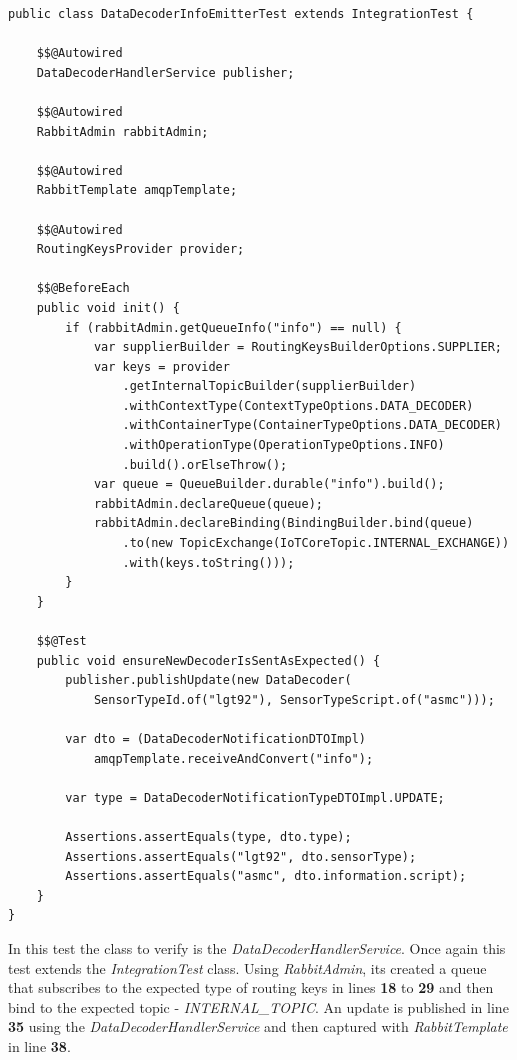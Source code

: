 \begin{lstlisting}[style=Java, caption=Functional Test - Message Broker Interaction - \textbf{Data Decoder Master Backend}, label={code:implementation:tests:func4}]
public class DataDecoderInfoEmitterTest extends IntegrationTest {

    $$@Autowired
    DataDecoderHandlerService publisher;

    $$@Autowired
    RabbitAdmin rabbitAdmin;

    $$@Autowired
    RabbitTemplate amqpTemplate;

    $$@Autowired
    RoutingKeysProvider provider;

    $$@BeforeEach
    public void init() {
        if (rabbitAdmin.getQueueInfo("info") == null) {
            var supplierBuilder = RoutingKeysBuilderOptions.SUPPLIER;
            var keys = provider
                .getInternalTopicBuilder(supplierBuilder)
                .withContextType(ContextTypeOptions.DATA_DECODER)
                .withContainerType(ContainerTypeOptions.DATA_DECODER)
                .withOperationType(OperationTypeOptions.INFO)
                .build().orElseThrow();
            var queue = QueueBuilder.durable("info").build();
            rabbitAdmin.declareQueue(queue);
            rabbitAdmin.declareBinding(BindingBuilder.bind(queue)
                .to(new TopicExchange(IoTCoreTopic.INTERNAL_EXCHANGE))
                .with(keys.toString()));
        }
    }

    $$@Test
    public void ensureNewDecoderIsSentAsExpected() {
        publisher.publishUpdate(new DataDecoder(
            SensorTypeId.of("lgt92"), SensorTypeScript.of("asmc")));

        var dto = (DataDecoderNotificationDTOImpl)
            amqpTemplate.receiveAndConvert("info");

        var type = DataDecoderNotificationTypeDTOImpl.UPDATE;

        Assertions.assertEquals(type, dto.type);
        Assertions.assertEquals("lgt92", dto.sensorType);
        Assertions.assertEquals("asmc", dto.information.script);
    }
}
\end{lstlisting}

In this test the class to verify is the \textit{DataDecoderHandlerService}. Once again this test extends the \textit{IntegrationTest} class. Using \textit{RabbitAdmin}, its created a queue that subscribes to the expected type of routing keys in lines \textbf{18} to \textbf{29} and then bind to the expected topic - \textit{INTERNAL\_TOPIC}.
An update is published in line \textbf{35} using the \textit{DataDecoderHandlerService} and then captured with \textit{RabbitTemplate} in line \textbf{38}.

